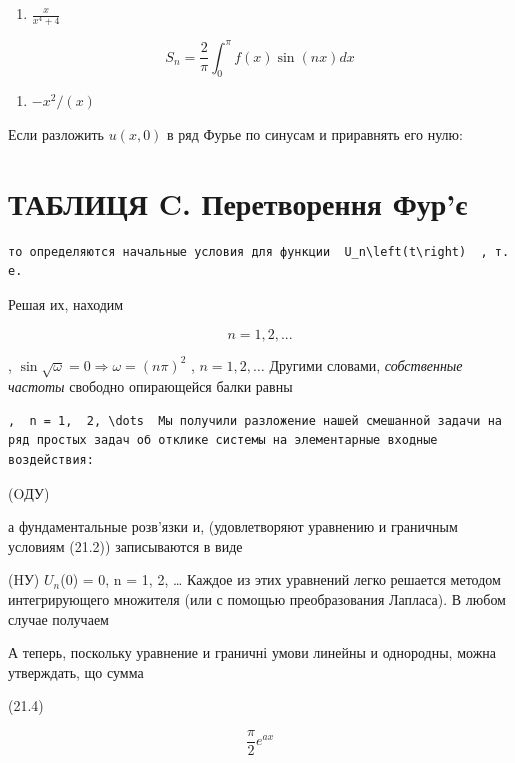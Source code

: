 \documentclass[
  ukrainian,
]{article}
\providecommand{\tightlist}{%
  \setlength{\itemsep}{0pt}\setlength{\parskip}{0pt}}
\begin{document}
\begin{enumerate}
\def\labelenumi{\arabic{enumi}.}
\setcounter{enumi}{7}
\tightlist
\item
  \(\frac{x}{x^4+4}\)
\end{enumerate}

\[
S_n = \frac{2}{\pi} \int_{0}^{\pi} f(x) \sin(nx) dx
\]

\begin{enumerate}
\def\labelenumi{\arabic{enumi}.}
\setcounter{enumi}{9}
\tightlist
\item
  \(-x^2/(x)\)
\end{enumerate}

Если разложить \(u(x, 0)\) в ряд Фурье по синусам и приравнять его нулю:

\section{ТАБЛИЦЯ C. Перетворення
Фур'є}\label{ux442ux430ux431ux43bux438ux446ux44f-c.-ux43fux435ux440ux435ux442ux432ux43eux440ux435ux43dux43dux44f-ux444ux443ux440ux454}

\begin{verbatim}
то определяются начальные условия для функции  U_n\left(t\right)  , т. е.
\end{verbatim}

Решая их, находим

\[
n = 1, 2, ...
\]

, \(\sin \sqrt{\omega} = 0 \Rightarrow \omega = (n\pi)^2\) ,
\(n = 1, 2, \dots\) Другими словами, \emph{собственные частоты} свободно
опирающейся балки равны

\begin{verbatim}
,  n = 1,  2, \dots  Мы получили разложение нашей смешанной задачи на ряд простых задач об отклике системы на элементарные входные воздействия:
\end{verbatim}

(OДУ)

а фундаментальные розв'язки и, (удовлетворяют уравнению и граничным
условиям (21.2)) записываются в виде

(HУ) \(U_n\)(0) = 0, n = 1, 2, \ldots{} Каждое из этих уравнений легко
решается методом интегрирующего множителя (или с помощью преобразования
Лапласа). В любом случае получаем

А теперь, поскольку уравнение и граничні умови линейны и однородны,
можна утверждать, що сумма

(21.4)

\[
\frac{\pi}{2} e^{ax}
\]
\end{document}
